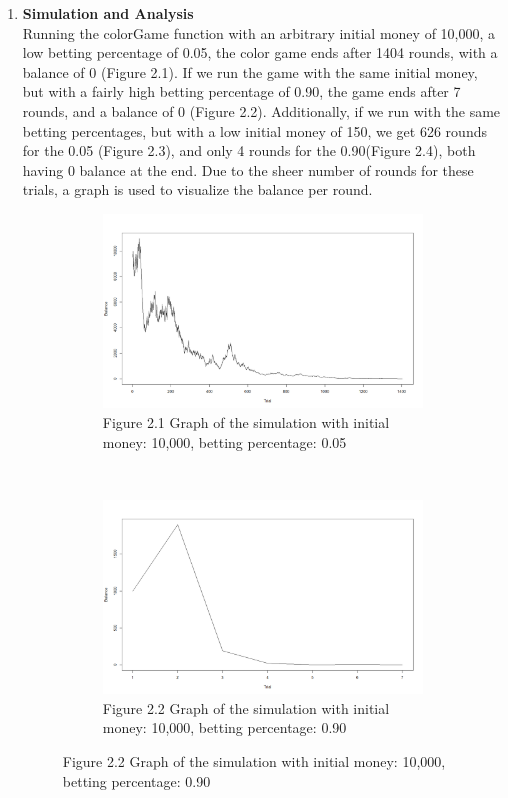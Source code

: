 \documentclass[12pt,letterpaper]{article}
\begin{document}
\begin{enumerate}[label=\Alph*]
\begin{lstlisting}[language=R]
\end{lstlisting}


\item \textbf{Simulation and Analysis}\\
 Running the colorGame function with an arbitrary initial money of 10,000, a low betting percentage of 0.05, the color game ends after 1404 rounds, with a balance of 0 (Figure 2.1). If we run the game with the same initial money, but with a fairly high betting percentage of 0.90, the game ends after 7 rounds, and a balance of 0 (Figure 2.2). Additionally, if we run with the same betting percentages, but with a low initial money of 150, we get 626 rounds for the 0.05 (Figure 2.3), and only 4 rounds for the 0.90(Figure 2.4), both having 0 balance at the end. Due to the sheer number of rounds for these trials, a graph is used to visualize the balance per round.
\begin{figure}[H]
	\centering
	\begin{subfigure}[h]{0.4\textwidth}	
		\includegraphics[width=\textwidth]{10000_0.05.png}
		\caption*{\footnotesize Figure 2.1 Graph of the simulation with initial money: 10,000, betting percentage:  0.05}
	\end{subfigure}~~~
	\begin{subfigure}[h]{0.4\textwidth}	
		\includegraphics[width=\textwidth]{10000_0.9.png}
		\caption*{\footnotesize Figure 2.2 Graph of the simulation with initial money: 10,000, betting percentage:  0.90}
	\end{subfigure}
	

\end{figure}
\end{enumerate}
\end{document}
